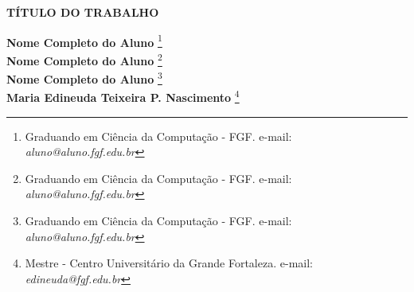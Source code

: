 \documentclass[12pt]{article}
\begin{document}

%



\begin{center}
\textbf{\Large{TÍTULO DO TRABALHO}}\\
\end{center}

\vspace*{0.2cm}

\begin{flushright}
 {\bf Nome Completo do Aluno} \footnote[1]{Graduando em Ciência da Computação - FGF. e-mail: \it aluno@aluno.fgf.edu.br}  \\
 {\bf Nome Completo do Aluno} \footnote[1]{Graduando em Ciência da Computação - FGF. e-mail: \it aluno@aluno.fgf.edu.br} \\
  {\bf Nome Completo do Aluno} \footnote[2]{Graduando em Ciência da Computação - FGF. e-mail: \it aluno@aluno.fgf.edu.br}  \\
   {\bf Maria Edineuda Teixeira P. Nascimento} \footnote[3]{Mestre - Centro Universitário da Grande Fortaleza. e-mail: \it edineuda@fgf.edu.br}   \\
\end{flushright}

\vspace*{0.5cm}

\end{document}
